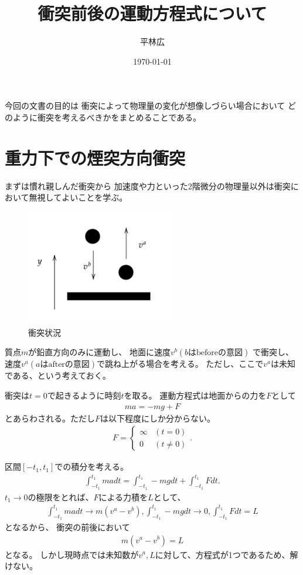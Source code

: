 \documentclass[a4paper,11pt]{jsarticle}
\begin{document}
\title{衝突前後の運動方程式について}
\author{平林広}
\date{\today}
\maketitle

今回の文書の目的は
衝突によって物理量の変化が想像しづらい場合において
どのように衝突を考えるべきかをまとめることである。

\section{重力下での煙突方向衝突}
まずは慣れ親しんだ衝突から
加速度や力といった2階微分の物理量以外は衝突において無視してよいことを学ぶ。

\begin{figure}[h]
  \centering
  \includegraphics[width = 0.6\textwidth]{ball_freefall.png}
  \caption{衝突状況}
  \label{ball_freefall.png}
\end{figure}

質点$m$が鉛直方向のみに運動し、
地面に速度$v^b (b\text{はbeforeの意図})$ で衝突し、
速度$v^a (a\text{はafterの意図})$で跳ね上がる場合を考える。
ただし、ここで$v^a$は未知である、という考えておく。

衝突は$t=0$で起きるように時刻$t$を取る。
運動方程式は地面からの力を$F$として
\begin{align*}
  m a = -mg + F
\end{align*}
とあらわされる。ただし$F$は以下程度にしか分からない。
\begin{align*}
  F = \begin{cases}
    \infty & (t = 0)
    \\
    0 & (t \neq 0)
  \end{cases}
  .
\end{align*}

区間$[-t_1, t_1]$での積分を考える。
\begin{align*}
  \int_{-t_1}^{t_1} m a dt = \int_{-t_1}^{t_1} -mg dt + \int_{-t_1}^{t_1} F dt
  .
\end{align*}
$t_1 \rightarrow 0$の極限をとれば、$F$による力積を$L$として、
\begin{gather*}
  \int_{-t_1}^{t_1} m a dt \rightarrow m(v^a - v^b),
  \int_{-t_1}^{t_1} -mg dt \rightarrow 0,
  \int_{-t_1}^{t_1} F dt = L
\end{gather*}
となるから、
衝突の前後において
\begin{gather}
  m(v^a - v^b) = L
  \label{case1:newton}
\end{gather}
となる。
しかし現時点では未知数が$v^a, L$に対して、方程式が1つであるため、解けない。
\end{document}
